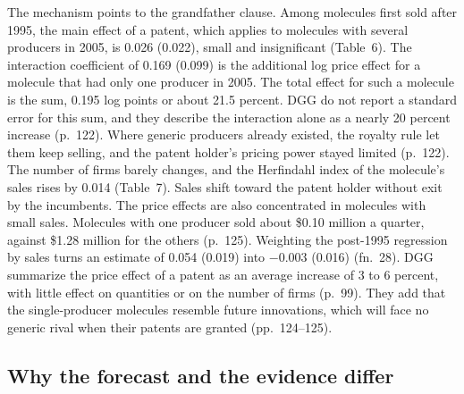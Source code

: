 The mechanism points to the grandfather clause. Among molecules first sold after 1995, the main effect of a patent,
which applies to molecules with several producers in 2005, is 0.026 (0.022), small and insignificant (Table~6). The
interaction coefficient of 0.169 (0.099) is the additional log price effect for a molecule that had only one producer
in 2005. The total effect for such a molecule is the sum, 0.195 log points or about 21.5 percent. DGG do not report a
standard error for this sum, and they describe the interaction alone as a nearly 20 percent increase (p.~122). Where
generic producers already existed,
the royalty rule let them keep selling, and the patent holder's pricing power stayed limited (p.~122). The number of
firms barely changes, and the Herfindahl index of the molecule's sales rises by 0.014 (Table~7). Sales shift toward
the patent holder without exit by the incumbents. The price effects are also concentrated in molecules with small
sales. Molecules with one producer sold about \$0.10 million a quarter, against \$1.28 million for the others
(p.~125). Weighting the post-1995 regression by sales turns an estimate of 0.054 (0.019) into $-0.003$ (0.016)
(fn.~28). DGG summarize the price effect of a patent as an average increase of 3 to 6 percent, with little effect on
quantities or on the number of firms (p.~99). They add that the single-producer molecules resemble future innovations,
which will face no generic rival when their patents are granted (pp.~124--125).

\subsection{Why the forecast and the evidence differ}\label{sec:05-forecast-gap}

